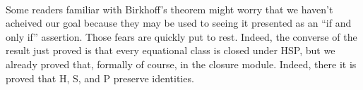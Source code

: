\begin{code}
\AgdaSpace{}%
\AgdaSpace{}%
\AgdaSpace{}%
\<%
\\
%
\\[\AgdaEmptyExtraSkip]%
%
\>[3]\AgdaSpace{}%
\AgdaSymbol{:}\AgdaSpace{}%
\AgdaSpace{}%
\AgdaSpace{}%
\<%
\\
%
\>[3]\AgdaSpace{}%
\AgdaSymbol{=}\AgdaSpace{}%
\AgdaSymbol{(}\AgdaSpace{}%
\AgdaOperator{\AgdaInductiveConstructor{,}}\AgdaSpace{}%
\AgdaSpace{}%
\AgdaSpace{}%
\AgdaSpace{}%
\AgdaSpace{}%
\AgdaOperator{\AgdaInductiveConstructor{,}}\AgdaSpace{}%
\AgdaSymbol{(}\AgdaSpace{}%
\AgdaSpace{}%
\AgdaSpace{}%
\AgdaSpace{}%
\AgdaOperator{\AgdaInductiveConstructor{,}}\AgdaSpace{}%
\AgdaSpace{}%
\AgdaSymbol{)}\AgdaSpace{}%
\AgdaSymbol{)}\AgdaSpace{}%
\AgdaOperator{\AgdaInductiveConstructor{,}}\AgdaSpace{}%
\<%
\\
%
\\[\AgdaEmptyExtraSkip]%
%
\>[3]\AgdaSpace{}%
\AgdaSymbol{:}\AgdaSpace{}%
\AgdaSpace{}%
\AgdaSpace{}%
\<%
\\
%
\>[3]\AgdaSpace{}%
\AgdaSymbol{=}\AgdaSpace{}%
\AgdaSpace{}%
\AgdaSymbol{(}\AgdaSpace{}%
\AgdaSymbol{)}\AgdaSpace{}%
\<%
\end{code}
\ccpad
Some readers familiar with Birkhoff's theorem might worry that we haven't acheived our goal because they may be used to seeing it presented as an ``if and only if'' assertion. Those fears are quickly put to rest. Indeed, the converse of the result just proved is that every equational class is closed under HSP, but we already proved that, formally of course, in the closure module. Indeed, there it is proved that H, S, and P preserve identities.
